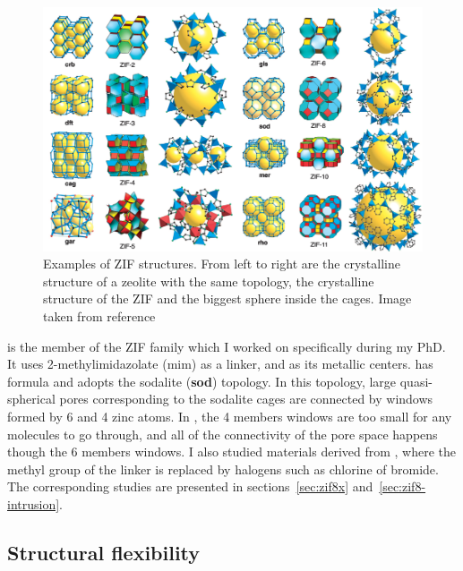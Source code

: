 \documentclass[thesis]{subfiles}
\begin{document}
\begin{figure}[b]
    \centering
    \includegraphics[width=\textwidth]{figures/cited/zif-examples}
    \caption{Examples of ZIF structures. From left to right are the crystalline
    structure of a zeolite with the same topology, the crystalline structure of
    the ZIF and the biggest sphere inside the cages. Image taken from
    reference~\cite{Park2006}}
    \label{fig:zif-examples}
\end{figure}

 is the member of the ZIF family which I worked on specifically during my
PhD. It uses 2-methylimidazolate (mim) as a linker, and  as its
metallic centers.  has formula  and adopts the sodalite
(\textbf{sod}) topology. In this topology, large quasi-spherical pores
corresponding to the sodalite cages are connected by windows formed by 6 and 4
zinc atoms. In , the 4 members windows are too small for any molecules to
go through, and all of the connectivity of the pore space happens though the 6
members windows. I also studied materials derived from , where the methyl
group of the linker is replaced by halogens such as chlorine of bromide. The
corresponding studies are presented in sections~\ref{sec:zif8x}
and~\ref{sec:zif8-intrusion}.

\newpage
\subsection{Structural flexibility}
\end{document}

